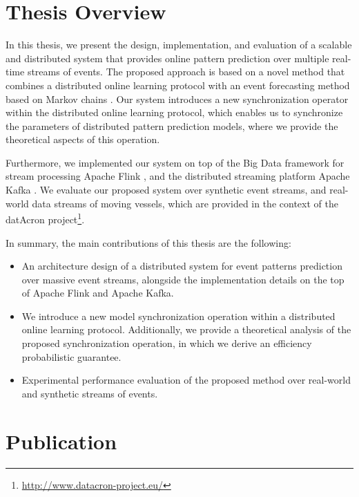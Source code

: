 \section{Thesis Overview}
\par In this thesis, we present the design, implementation, and evaluation of a scalable and distributed system that provides online pattern prediction over multiple real-time streams of events. The proposed approach is based on a novel method that combines a distributed online learning protocol \cite{dekel2012optimal,kamp2014communication} with an event forecasting method based on Markov chains \cite{alevizos2017event}. Our system introduces a new synchronization operator within the distributed online learning protocol, which enables us to synchronize the parameters of distributed pattern prediction models, where we provide the theoretical aspects of this operation.

Furthermore, we implemented our system on top of the Big Data framework for stream processing Apache Flink \cite{Flink}, and the distributed streaming platform Apache Kafka \cite{Kafka}. We evaluate our proposed system over synthetic event streams, and real-world data streams of moving vessels, which are provided in the context of the datAcron project\footnote{\url{http://www.datacron-project.eu/}}.

In summary, the main contributions of this thesis are the following:

\begin{itemize}
	\item An architecture design of a distributed system for  event patterns prediction over massive event streams, alongside the implementation details on the top of Apache Flink and Apache Kafka.  
	\item We introduce a new model synchronization operation within a distributed online learning protocol. Additionally, we provide a theoretical analysis of the proposed synchronization operation, in which we derive an  efficiency probabilistic guarantee. 
	\item Experimental performance evaluation of the proposed method over real-world and synthetic streams of events.
  
\end{itemize}


\section{Publication}

